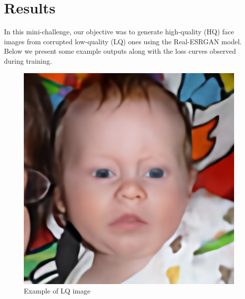 \section{Results}
\label{sec:results} %

In this mini-challenge, our objective was to generate high-quality (HQ) face images from corrupted low-quality (LQ) ones using the Real-ESRGAN model. Below we present some example outputs along with the loss curves observed during training.

\begin{figure}[htbp]
    \centering
    \begin{minipage}{0.45\textwidth}
        \centering
        \includegraphics[width=\textwidth]{imgs/output_00328.png}
        \caption{Example of LQ image}
        \label{fig:image1}
    \end{minipage}\hfill
    \begin{minipage}{0.45\textwidth}
        \centering

\end{minipage}
\end{figure}
